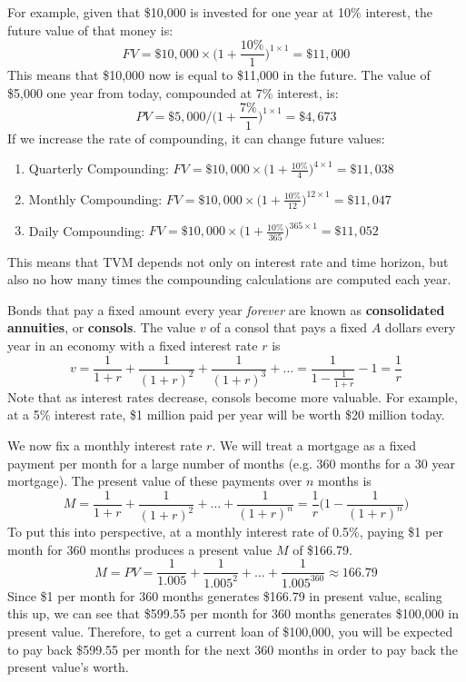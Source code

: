 \documentclass{article}
\begin{document}
    \begin{example}
      For example, given that \$10,000 is invested for one year at 10\% interest, the future value of that money is: 
      \[FV = \$10,000 \times \bigg(1 + \frac{10\%}{1}\bigg)^{1 \times 1} = \$11,000\]
      This means that \$10,000 now is equal to \$11,000 in the future. The value of \$5,000 one year from today, compounded at 7\% interest, is: 
      \[PV = \$5,000 \bigg/ \bigg(1 + \frac{7\%}{1}\bigg)^{1 \times 1} =  \$4,673\]
      If we increase the rate of compounding, it can change future values: 
      \begin{enumerate}
          \item Quarterly Compounding: $FV = \$10,000 \times \Big( 1 + \frac{10\%}{4}\Big)^{4 \times 1} = \$11,038$
          \item Monthly Compounding: $FV = \$10,000 \times \Big( 1 + \frac{10\%}{12}\Big)^{12 \times 1} = \$11,047$
          \item Daily Compounding: $FV = \$10,000 \times \Big( 1 + \frac{10\%}{365}\Big)^{365 \times 1} = \$11,052$
      \end{enumerate}
      This means that TVM depends not only on interest rate and time horizon, but also no how many times the compounding calculations are computed each year. 
    \end{example}

    \begin{definition}[Consols]
      Bonds that pay a fixed amount every year \textit{forever} are known as \textbf{consolidated annuities}, or \textbf{consols}. The value $v$ of a consol that pays a fixed $A$ dollars every year in an economy with a fixed interest rate $r$ is 
      \[v = \frac{1}{1+r} + \frac{1}{(1+r)^2} + \frac{1}{(1+r)^3} + \ldots  = \frac{1}{1 - \frac{1}{1+r}} - 1 = \frac{1}{r}\]
      Note that as interest rates decrease, consols become more valuable. For example, at a 5\% interest rate, \$1 million paid per year will be worth \$20 million today. 
    \end{definition}

    \begin{example}[Mortgages]
      We now fix a monthly interest rate $r$. We will treat a mortgage as a fixed payment per month for a large number of months (e.g. 360 months for a 30 year mortgage). The present value of these payments over $n$ months is 
      \[M = \frac{1}{1+r} + \frac{1}{(1+r)^2} + \ldots + \frac{1}{(1+r)^n} = \frac{1}{r} \bigg( 1 - \frac{1}{(1+r)^n}\bigg)\]
      To put this into perspective, at a monthly interest rate of 0.5\%, paying \$1 per month for 360 months produces a present value $M$ of \$166.79. 
      \[M = PV = \frac{1}{1.005} + \frac{1}{1.005^2} + \ldots + \frac{1}{1.005^360} \approx 166.79\]
      Since \$1 per month for 360 months generates \$166.79 in present value, scaling this up, we can see that \$599.55 per month for 360 months generates \$100,000 in present value. Therefore, to get a current loan of \$100,000, you will be expected to pay back \$599.55 per month for the next 360 months in order to pay back the present value's worth. 
    \end{example}
\end{document}
